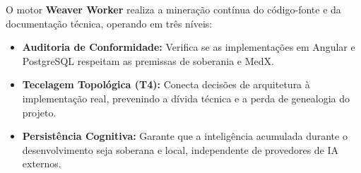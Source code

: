 O motor \textbf{Weaver Worker} realiza a mineração contínua do código-fonte e da documentação técnica, operando em três níveis:
\begin{itemize}
    \item \textbf{Auditoria de Conformidade:} Verifica se as implementações em Angular e PostgreSQL respeitam as premissas de soberania e MedX.
    \item \textbf{Tecelagem Topológica (T4):} Conecta decisões de arquitetura à implementação real, prevenindo a dívida técnica e a perda de genealogia do projeto.
    \item \textbf{Persistência Cognitiva:} Garante que a inteligência acumulada durante o desenvolvimento seja soberana e local, independente de provedores de IA externos.
\end{itemize}